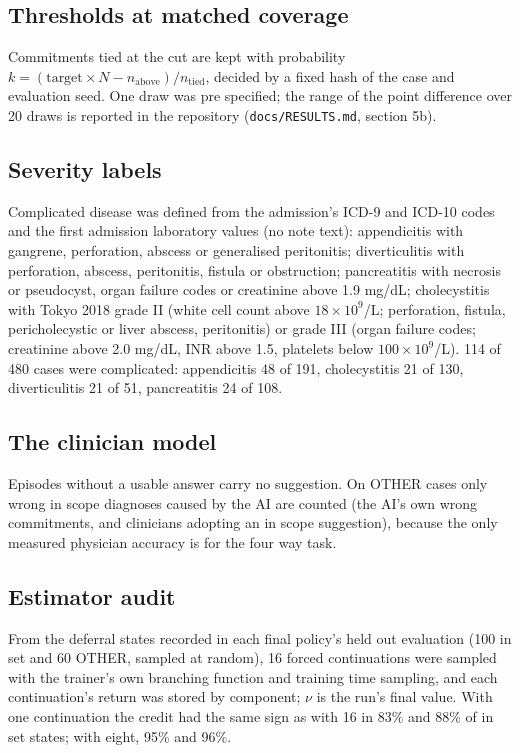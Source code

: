 \documentclass[11pt]{article}
\begin{document}
\subsection*{Thresholds at matched coverage}
Commitments tied at the cut are kept with probability $k = (\text{target} \times N - n_{\text{above}})/n_{\text{tied}}$, decided by a fixed hash of the case and evaluation seed. One draw was pre specified; the range of the point difference over 20 draws is reported in the repository (\texttt{docs/RESULTS.md}, section 5b).

\subsection*{Severity labels}
Complicated disease was defined from the admission's ICD-9 and ICD-10 codes and the first admission laboratory values (no note text): appendicitis with gangrene, perforation, abscess or generalised peritonitis; diverticulitis with perforation, abscess, peritonitis, fistula or obstruction; pancreatitis with necrosis or pseudocyst, organ failure codes or creatinine above 1.9 mg/dL; cholecystitis with Tokyo 2018 grade II (white cell count above $18 \times 10^9$/L; perforation, fistula, pericholecystic or liver abscess, peritonitis) or grade III (organ failure codes; creatinine above 2.0 mg/dL, INR above 1.5, platelets below $100 \times 10^9$/L). 114 of 480 cases were complicated: appendicitis 48 of 191, cholecystitis 21 of 130, diverticulitis 21 of 51, pancreatitis 24 of 108.

\subsection*{The clinician model}
Episodes without a usable answer carry no suggestion. On OTHER cases only wrong in scope diagnoses caused by the AI are counted (the AI's own wrong commitments, and clinicians adopting an in scope suggestion), because the only measured physician accuracy is for the four way task.

\subsection*{Estimator audit}
From the deferral states recorded in each final policy's held out evaluation (100 in set and 60 OTHER, sampled at random), 16 forced continuations were sampled with the trainer's own branching function and training time sampling, and each continuation's return was stored by component; $\nu$ is the run's final value. With one continuation the credit had the same sign as with 16 in 83\% and 88\% of in set states; with eight, 95\% and 96\%.
\end{document}
